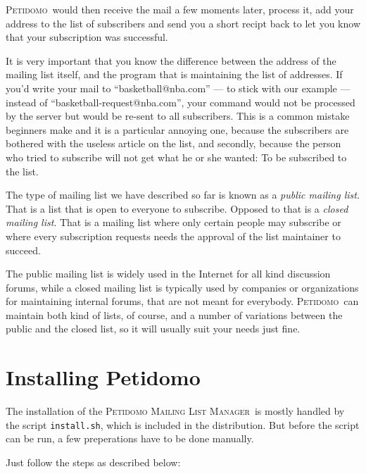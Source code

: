 \documentclass[a4paper]{report}
\newcommand{\PetidomoM}{{\scshape Peti\-domo Mail\-ing List Ma\-nager}}
\newcommand{\Petidomo}{{\scshape Peti\-domo}}
\newcommand{\Def}[1]{{\index{#1}\sl #1}}
\newcommand{\file}[1]{{\tt #1}}
\begin{document}
\Petidomo\ would then receive the mail a few moments later, process
it, add your address to the list of subscribers and send you a short
recipt back to let you know that your subscription was successful.

It is very important that you know the difference between the address
of the mailing list itself, and the program that is maintaining the
list of addresses. If you'd write your mail to ``basketball@nba.com''
--- to stick with our example --- instead of
``basketball-request@nba.com'', your command would not be processed by
the server but would be re-sent to all subscribers. This is a common
mistake beginners make and it is a particular annoying one, because
the subscribers are bothered with the useless article on the list, and
secondly, because the person who tried to subscribe will not get what
he or she wanted: To be subscribed to the list.

The type of mailing list we have described so far is known as a
\Def{public mailing list}. That is a list that is open to everyone to
subscribe. Opposed to that is a \Def{closed mailing list}. That is a
mailing list where only certain people may subscribe or where every
subscription requests needs the approval of the list maintainer to
succeed.

The public mailing list is widely used in the Internet for all kind
discussion forums, while a closed mailing list is typically used by
companies or organizations for maintaining internal forums, that are
not meant for everybody. \Petidomo\ can maintain both kind of lists,
of course, and a number of variations between the public and the
closed list, so it will usually suit your needs just fine.

\chapter{Installing Petidomo}

The installation of the \PetidomoM\ is mostly handled by the script
\file{install.sh}, which is included in the distribution. But before
the script can be run, a few preperations have to be done manually.

Just follow the steps as described below:
\end{document}
